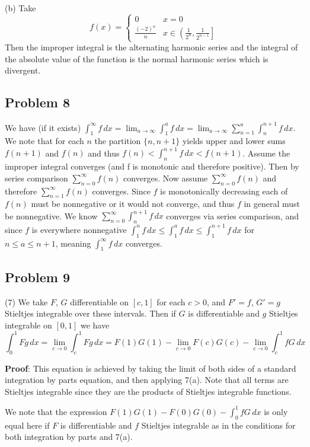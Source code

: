 \documentclass{amsart}
\begin{document}
\medskip \noindent (b) Take \[f(x)= \begin{cases}
	0 & x=0 \\
	\frac{(-2)^n}{n} & x\in\left(\frac{1}{2^n},\frac{1}{2^{n-1}}\right]
\end{cases}\] Then the improper integral is the alternating harmonic series and the integral of the absolute value of the function is the normal harmonic series which is divergent.

\subsection*{Problem 8}
We have (if it exists) $\int_1^{\infty}f\,dx = \lim_{a\to\infty}\int_1^af\,dx = \lim_{a\to\infty}\sum_{n=1}^a \int_n^{n+1}f\,dx$. We note that for each $n$ the partition $\{n, n+1\}$ yields upper and lower sums $f(n+1)$ and $f(n)$ and thus $f(n)<\int_n^{n+1}f\,dx<f(n+1)$. Assume the improper integral converges (and f is monotonic and therefore positive). Then by series comparison $\sum_{n=0}^{\infty} f(n)$ converges. Now assume $\sum_{n=0}^{\infty}f(n)$ and therefore $\sum_{n=1}^{\infty}f(n)$ converges. Since $f$ is monotonically decreasing each of $f(n)$ must be nonnegative or it would not converge, and thus $f$ in general must be nonnegative. We know $\sum_{n=0}^{\infty}\int_n^{n+1}f\,dx$ converges via series comparison, and since $f$ is everywhere nonnegative $\int_1^nf\,dx\leq\int_1^af\,dx\leq\int_1^{n+1}f\,dx$ for $n\leq a\leq n+1$, meaning $\int_1^{\infty}f\,dx$ converges.

\subsection*{Problem 9}
(7) We take $F$, $G$ differentiable on $[c, 1]$ for each $c>0$, and $F'=f$, $G'=g$ Stieltjes integrable over these intervals. Then if $G$ is differentiable and $g$ Stieltjes integrable on $[0,1]$ we have \[\int_0^1Fg\,dx=\lim_{c\to0}\int_c^1Fg\,dx=F(1)G(1)-\lim_{c\to0}F(c)G(c)-\lim_{c\to0}\int_c^1fG\,dx\]

\medskip \noindent \textbf{Proof}: This equation is achieved by taking the limit of both sides of a standard integration by parts equation, and then applying 7(a). Note that all terms are Stieltjes integrable since they are the products of Stieltjes integrable functions.

\medskip \noindent We note that the expression $F(1)G(1)-F(0)G(0)-\int_0^1 fG\,dx$ is only equal here if $F$ is differentiable and $f$ Stieltjes integrable as in the conditions for both integration by parts and 7(a). 
\end{document}
